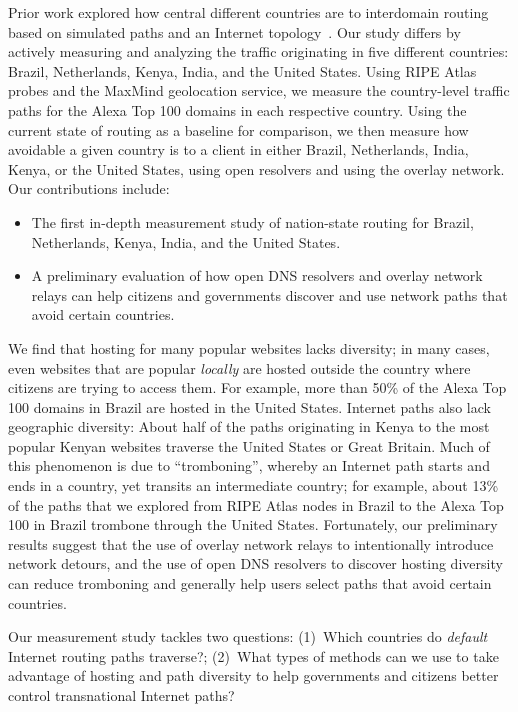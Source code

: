 Prior work explored how central different countries are to interdomain 
routing based on simulated paths and an Internet topology~\cite{karlin2009nation}. 
Our study differs by actively measuring and analyzing the traffic originating in
five different countries: Brazil, Netherlands, Kenya, India, and the
United States.  Using RIPE Atlas probes and the MaxMind geolocation
service, we measure the country-level traffic paths for the Alexa Top
100 domains in each respective country.  Using the current state of
routing as a baseline for comparison, we then measure how avoidable a
given country is to a client in either Brazil, Netherlands, India,
Kenya, or the United States, using open resolvers and using the overlay
network.  Our contributions include: 

\begin{itemize}
\item The first in-depth measurement study of
  nation-state routing for Brazil, Netherlands, Kenya, India, and the
  United States. 
\item A preliminary evaluation of how open DNS resolvers and overlay
  network relays can help citizens and governments discover and use
  network paths that avoid certain countries.
\end{itemize}
\noindent
We find that hosting for many popular websites lacks diversity; in many
cases, even websites that are popular {\em locally} are hosted outside
the country where citizens are trying to access them. For example, more
than 50\% of the Alexa Top 100 domains in Brazil are hosted in the
United States. Internet paths also lack geographic diversity: About half
of the paths originating in Kenya to the most popular Kenyan websites
traverse the United States or Great Britain. Much of this phenomenon is
due to ``tromboning'', whereby an Internet path starts and ends in a
country, yet transits an intermediate country; for example, about 13\%
of the paths that we explored from RIPE Atlas nodes in Brazil to the
Alexa Top 100 in Brazil trombone through the United States. Fortunately,
our preliminary results suggest that the use of overlay network relays
to intentionally introduce network detours, and the use of open DNS
resolvers to discover hosting diversity can reduce tromboning and
generally help users select paths that avoid certain countries.

Our measurement study tackles two questions: (1)~Which countries do {\em
  default} Internet routing paths traverse?; (2)~What types of methods
can we use to take advantage of hosting and path diversity to help governments
and citizens better control transnational Internet paths?

